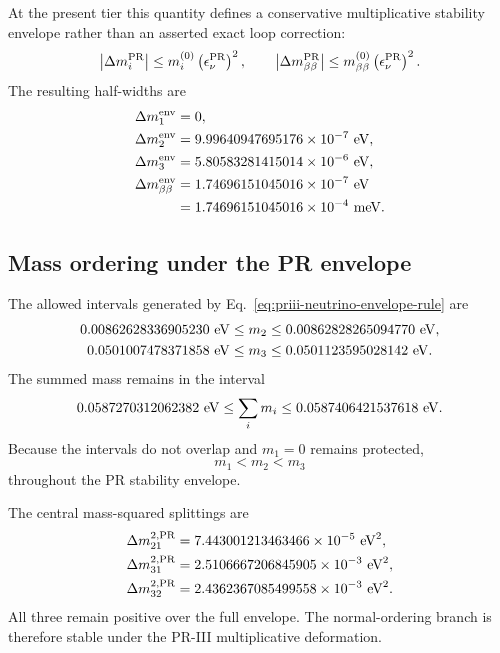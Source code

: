 \documentclass[11pt]{article}
\begin{document}
At the present tier this quantity defines a conservative multiplicative stability envelope rather than an asserted exact loop correction:
\begin{equation}
\left|\Delta m_i^{\rm PR}\right|
\leq
m_i^{(0)}
\left(\epsilon_\nu^{\rm PR}\right)^2,
\qquad
\left|\Delta m_{\beta\beta}^{\rm PR}\right|
\leq
m_{\beta\beta}^{(0)}
\left(\epsilon_\nu^{\rm PR}\right)^2.
\label{eq:priii-neutrino-envelope-rule}
\end{equation}
The resulting half-widths are
\begin{align}
\Delta m_1^{\rm env}&=0,\\
\Delta m_2^{\rm env}
&=
9.99640947695176\times10^{-7}\ {\rm eV},\\
\Delta m_3^{\rm env}
&=
5.80583281415014\times10^{-6}\ {\rm eV},\\
\Delta m_{\beta\beta}^{\rm env}
&=
1.74696151045016\times10^{-7}\ {\rm eV}\\
&=
1.74696151045016\times10^{-4}\ {\rm meV}.
\end{align}

\subsection{Mass ordering under the PR envelope}
\label{subsec:priii-neutrino-ordering-envelope}

The allowed intervals generated by Eq.~\eqref{eq:priii-neutrino-envelope-rule} are
\begin{align}
0.00862628336905230\ {\rm eV}
&\leq
m_2
\leq
0.00862828265094770\ {\rm eV},
\\
0.0501007478371858\ {\rm eV}
&\leq
m_3
\leq
0.0501123595028142\ {\rm eV}.
\end{align}
The summed mass remains in the interval
\begin{equation}
0.0587270312062382\ {\rm eV}
\leq
\sum_i m_i
\leq
0.0587406421537618\ {\rm eV}.
\label{eq:priii-neutrino-sum-envelope}
\end{equation}
Because the intervals do not overlap and \(m_1=0\) remains protected,
\begin{equation}
m_1<m_2<m_3
\end{equation}
throughout the PR stability envelope.

The central mass-squared splittings are
\begin{align}
\Delta m_{21}^{2,{\rm PR}}
&=
7.443001213463466\times10^{-5}\ {\rm eV}^2,
\\
\Delta m_{31}^{2,{\rm PR}}
&=
2.5106667206845905\times10^{-3}\ {\rm eV}^2,
\\
\Delta m_{32}^{2,{\rm PR}}
&=
2.4362367085499558\times10^{-3}\ {\rm eV}^2.
\end{align}
All three remain positive over the full envelope.  The normal-ordering branch is therefore stable under the PR-III multiplicative deformation.
\end{document}
